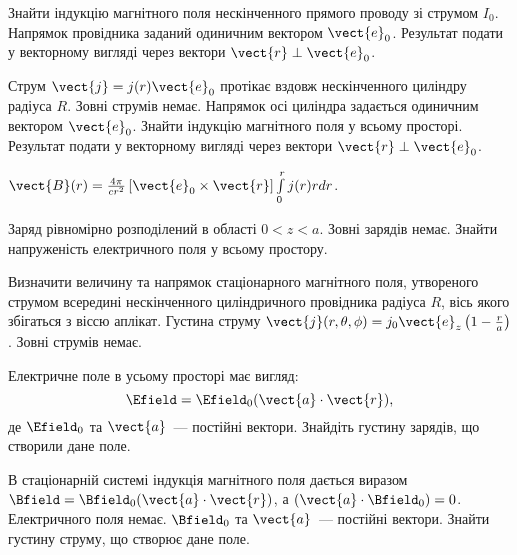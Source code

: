 \begin{problem}
Знайти індукцію магнітного поля нескінченного прямого проводу зі струмом  $I_0$. Напрямок провідника заданий одиничним вектором $\vect{e}_0$. Результат подати у векторному вигляді через вектори $\vect{r} \perp \vect{e}_0$.
\end{problem}

\begin{problem}
Струм $\vect{j} = j(r)\vect{e}_0$ протікає вздовж нескінченного циліндру радіуса $R$. Зовні струмів немає. Напрямок осі циліндра задається одиничним вектором $\vect{e}_0$. Знайти індукцію магнітного поля у всьому просторі. Результат подати у векторному вигляді через вектори $\vect{r} \perp \vect{e}_0$.
\begin{solution}
	$\vect{B}(r) = \frac{4\pi}{cr^2}\left[ \vect{e}_0 \times \vect{r} \right]\int\limits_0^r j(r)r dr$.
\end{solution}
\end{problem}

\begin{problem}
Заряд рівномірно розподілений в області  $0 < z < a$. Зовні зарядів немає. Знайти напруженість електричного поля  у всьому простору.
\end{problem}

\begin{problem}
Визначити величину та напрямок стаціонарного магнітного поля, утвореного струмом всередині нескінченного циліндричного провідника радіуса $R$, вісь якого збігаться з віссю аплікат.  Густина струму   $\vect{j}(r, \theta,\phi) = j_0\vect{e}_z \left( 1- \frac{r}{a}\right) $. Зовні струмів немає.
\end{problem}

\begin{problem}
Електричне поле в усьому просторі має вигляд:
\[
	\Efield = \Efield_0 (\vect{a}\cdot \vect{r}),
\]
де $\Efield_0$ та $\vect{a}$~--- постійні вектори. Знайдіть густину зарядів, що створили дане поле.
\end{problem}

\begin{problem}
В стаціонарній системі індукція магнітного поля дається виразом $\Bfield = \Bfield_0 (\vect{a}\cdot \vect{r})$, а $(\vect{a}\cdot \Bfield_0) = 0$.  Електричного поля немає. $\Bfield_0$ та $\vect{a}$~--- постійні вектори. Знайти густину струму, що створює дане поле.
\end{problem}

